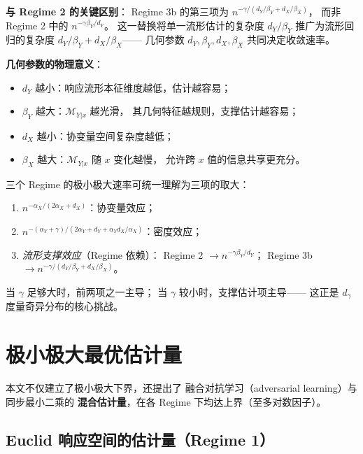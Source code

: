 \textbf{与 Regime 2 的关键区别}：
Regime 3b 的第三项为
$n^{-\gamma/(d_Y/\beta_Y + d_X/\beta_X)}$，
而非 Regime 2 中的 $n^{-\gamma\beta_Y/d_Y}$。
这一替换将单一流形估计的复杂度
$d_Y/\beta_Y$ 推广为流形回归的复杂度
$d_Y/\beta_Y + d_X/\beta_X$——
几何参数 $d_Y, \beta_Y, d_X, \beta_X$ 共同决定收敛速率。

\textbf{几何参数的物理意义}：
\begin{itemize}
    \item $d_Y$ 越小：响应流形本征维度越低，估计越容易；
    \item $\beta_Y$ 越大：$\mathcal{M}_{Y|x}$ 越光滑，
          其几何特征越规则，支撑估计越容易；
    \item $d_X$ 越小：协变量空间复杂度越低；
    \item $\beta_X$ 越大：$\mathcal{M}_{Y|x}$ 随 $x$ 变化越慢，
          允许跨 $x$ 值的信息共享更充分。
\end{itemize}

\begin{Remark}\label{rem:regime-comparison}
    三个 Regime 的极小极大速率可统一理解为三项的取大：
    \begin{enumerate}
        \item $n^{-\alpha_X/(2\alpha_X+d_X)}$：协变量效应；
        \item $n^{-(\alpha_Y+\gamma)/(2\alpha_Y+d_Y+\alpha_Y d_X/\alpha_X)}$：密度效应；
        \item \textit{流形支撑效应}（Regime 依赖）：
              Regime 2 $\to n^{-\gamma\beta_Y/d_Y}$；
              Regime 3b $\to n^{-\gamma/(d_Y/\beta_Y+d_X/\beta_X)}$\allowbreak。
    \end{enumerate}
    当 $\gamma$ 足够大时，前两项之一主导；
    当 $\gamma$ 较小时，支撑估计项主导——
    这正是 $d_\gamma$ 度量奇异分布的核心挑战。
\end{Remark}

\section{极小极大最优估计量}\label{sec:ch2-estimators}

本文不仅建立了极小极大下界，还提出了
融合对抗学习（adversarial learning）与同步最小二乘的
\textbf{混合估计量}，在各 Regime 下均达上界（至多对数因子）。

\subsection{Euclid 响应空间的估计量（Regime 1）}\label{sec:ch2-estimator-regime1}

